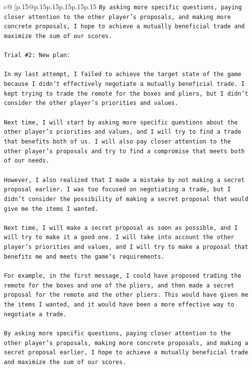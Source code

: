 \documentclass{article}
\begin{document}
{\begin{supertabular}{c@{$\;$}|p{.15\linewidth}@{}p{.15\linewidth}p{.15\linewidth}p{.15\linewidth}p{.15\linewidth}p{.15\linewidth}}
{{{\texttt{By asking more specific questions, paying closer attention to the other player's proposals, and making more concrete proposals, I hope to achieve a mutually beneficial trade and maximize the sum of our scores.} \\
\\ 
\texttt{Trial \#2: New plan: } \\
\\ 
\texttt{In my last attempt, I failed to achieve the target state of the game because I didn't effectively negotiate a mutually beneficial trade. I kept trying to trade the remote for the boxes and pliers, but I didn't consider the other player's priorities and values. } \\
\\ 
\texttt{Next time, I will start by asking more specific questions about the other player's priorities and values, and I will try to find a trade that benefits both of us. I will also pay closer attention to the other player's proposals and try to find a compromise that meets both of our needs. } \\
\\ 
\texttt{However, I also realized that I made a mistake by not making a secret proposal earlier. I was too focused on negotiating a trade, but I didn't consider the possibility of making a secret proposal that would give me the items I wanted. } \\
\\ 
\texttt{Next time, I will make a secret proposal as soon as possible, and I will try to make it a good one. I will take into account the other player's priorities and values, and I will try to make a proposal that benefits me and meets the game's requirements. } \\
\\ 
\texttt{For example, in the first message, I could have proposed trading the remote for the boxes and one of the pliers, and then made a secret proposal for the remote and the other pliers. This would have given me the items I wanted, and it would have been a more effective way to negotiate a trade. } \\
\\ 
\texttt{By asking more specific questions, paying closer attention to the other player's proposals, making more concrete proposals, and making a secret proposal earlier, I hope to achieve a mutually beneficial trade and maximize the sum of our scores.} \\
\\ 
\\ 
}}}
\end{supertabular}}
\end{document}
